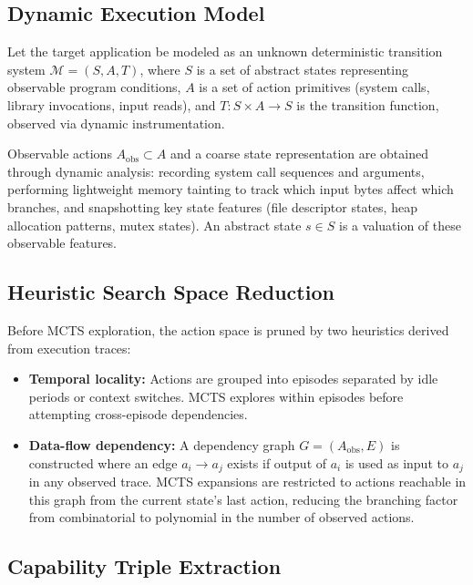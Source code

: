 \documentclass[11pt, a4paper]{article}
\begin{document}
\vspace{1em}

\subsection{Dynamic Execution Model}

Let the target application be modeled as an unknown deterministic transition system $\mathcal{M} = (S, A, T)$, where $S$ is a set of abstract states representing observable program conditions, $A$ is a set of action primitives (system calls, library invocations, input reads), and $T: S \times A \to S$ is the transition function, observed via dynamic instrumentation.

Observable actions $A_{\text{obs}} \subset A$ and a coarse state representation are obtained through dynamic analysis: recording system call sequences and arguments, performing lightweight memory tainting to track which input bytes affect which branches, and snapshotting key state features (file descriptor states, heap allocation patterns, mutex states). An abstract state $s \in S$ is a valuation of these observable features.

\subsection{Heuristic Search Space Reduction}

Before MCTS exploration, the action space is pruned by two heuristics derived from execution traces:

\begin{itemize}[leftmargin=*]
  \item \textbf{Temporal locality:} Actions are grouped into episodes separated by idle periods or context switches. MCTS explores within episodes before attempting cross-episode dependencies.
  \item \textbf{Data-flow dependency:} A dependency graph $G = (A_{\text{obs}}, E)$ is constructed where an edge $a_i \to a_j$ exists if output of $a_i$ is used as input to $a_j$ in any observed trace. MCTS expansions are restricted to actions reachable in this graph from the current state's last action, reducing the branching factor from combinatorial to polynomial in the number of observed actions.
\end{itemize}

\subsection{Capability Triple Extraction}
\end{document}
